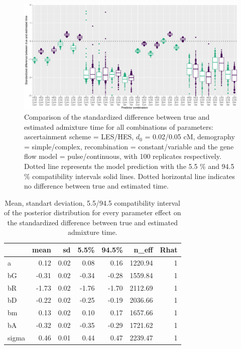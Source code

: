 \documentclass[]{article}
\begin{document}
\begin{figure}
\centering
\includegraphics{Admixture_Time_Inference_Paper_Draft_files/figure-latex/figS2-1.pdf}
\caption{\label{fig:figS2} Comparison of the standardized difference between true and estimated admixture time for all combinations of parameters: ascertainment scheme = LES/HES,  $d_{0}$ = 0.02/0.05 cM, demography = simple/complex, recombination = constant/variable and the gene flow model = pulse/continuous, with 100 replicates respectively. Dotted line represents the model prediction with the 5.5 \% and 94.5 \% compatibility intervals solid lines. Dotted horizontal line indicates no difference between true and estimated time.}
\end{figure}

\begin{table}[H]

\caption{\label{tab:tableS1}\label{tab:tableS1} Mean, standart deviation, 5.5/94.5 compatibility interval of the posterior distribution for every parameter effect on the standardized difference between true and estimated admixture time.}
\centering
\begin{tabular}{l|r|r|r|r|r|r}
\hline
  & mean & sd & 5.5\% & 94.5\% & n\_eff & Rhat\\
\hline
a & 0.12 & 0.02 & 0.08 & 0.16 & 1220.94 & 1\\
\cline{1-7}
bG & -0.31 & 0.02 & -0.34 & -0.28 & 1559.84 & 1\\
\cline{1-7}
bR & -1.73 & 0.02 & -1.76 & -1.70 & 2112.69 & 1\\
\cline{1-7}
bD & -0.22 & 0.02 & -0.25 & -0.19 & 2036.66 & 1\\
\cline{1-7}
bm & 0.13 & 0.02 & 0.10 & 0.17 & 1657.66 & 1\\
\cline{1-7}
bA & -0.32 & 0.02 & -0.35 & -0.29 & 1721.62 & 1\\
\cline{1-7}
sigma & 0.46 & 0.01 & 0.44 & 0.47 & 2239.47 & 1\\
\hline
\end{tabular}
\end{table}
\end{document}
